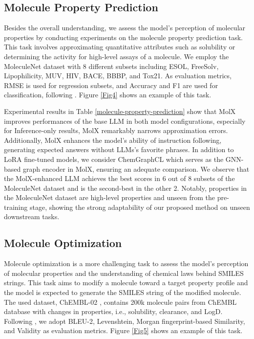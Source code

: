 \subsection{Molecule Property Prediction}
Besides the overall understanding, we assess the model’s perception of molecular properties by conducting experiments on the molecule property prediction task. This task involves approximating quantitative attributes such as solubility or determining the activity for high-level assays of a molecule. We employ the MoleculeNet dataset \cite{wu2018moleculenet} with 8 different subsets including ESOL, FreeSolv, Lipophilicity, MUV, HIV, BACE, BBBP, and Tox21. As evaluation metrics, RMSE is used for regression subsets, and Accuracy and F1 are used for classification, following \cite{yu2024llasmol}. Figure \ref{Fig4} shows an example of this task. 

\noindent
Experimental results in Table \ref{molecule-property-prediction} show that MolX improves performances of the base LLM in both model configurations, especially for Inference-only results, MolX remarkably narrows approximation errors. Additionally, MolX enhances the model’s ability of instruction following, generating expected answers without LLMs’s favorite phrases. In addition to LoRA fine-tuned models, we consider ChemGraphCL \cite{you2020graph} which serves as the GNN-based graph encoder in MolX, ensuring an adequate comparison. We observe that the MolX-enhanced LLM achieves the best scores in 6 out of 8 subsets of the MoleculeNet dataset and is the second-best in the other 2. Notably, properties in the MoleculeNet dataset are high-level properties and unseen from the pre-training stage, showing the strong adaptability of our proposed method on unseen downstream tasks. 

\subsection{Molecule Optimization}
Molecule optimization \cite{he2021molecular} is a more challenging task to assess the model’s perception of molecular properties and the understanding of chemical laws behind SMILES strings. This task aims to modify a molecule toward a target property profile and the model is expected to generate the SMILES string of the modified molecule. The used dataset, ChEMBL-02 \cite{he2021molecular}, contains 200k molecule pairs from ChEMBL database \cite{gaulton2012chembl} with changes in properties, i.e., solubility, clearance, and LogD. Following \cite{edwards2022translation}, we adopt BLEU-2, Levenshtein, Morgan fingerprint-based Similarity, and Validity as evaluation metrics. Figure \ref{Fig5} shows an example of this task. 

